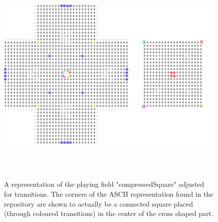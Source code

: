 \documentclass[a4paper,12pt]{article}
\begin{document}
\begin{figure}[H]
    \centering
    \includegraphics[height=11cm]{pictures/assignment1/compressedSquare.png}
    \caption{A representation of the playing field "compressedSquare" adjusted for transitions. The corners of the ASCII representation found in the repository are shown to actually be a connected square placed (through coloured transitions)  in the center of the cross shaped part.}
    \label{fig:compressedSquare}
\end{figure}
\end{document}
